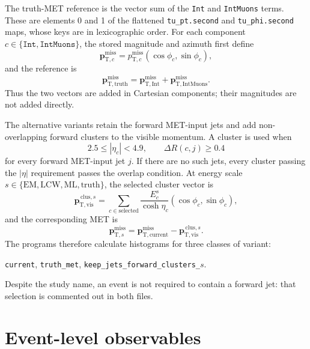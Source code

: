\documentclass[11pt,a4paper]{article}
\newcommand{\vmet}[1]{\boldsymbol{p}_{\mathrm{T},#1}^{\mathrm{miss}}}
\begin{document}
The truth-MET reference is the vector sum of the \texttt{Int} and
\texttt{IntMuons} terms.  These are elements 0 and 1 of the flattened
\texttt{tu\_pt.second} and \texttt{tu\_phi.second} maps, whose keys are in
lexicographic order.  For each component
$c\in\{\texttt{Int},\texttt{IntMuons}\}$, the stored magnitude and azimuth
first define
\begin{equation}
  \vmet{c}=p_{\mathrm{T},c}^{\mathrm{miss}}
    (\cos\phi_c,\sin\phi_c),
\end{equation}
and the reference is
\begin{equation}
  \vmet{\mathrm{truth}}
  =\vmet{\mathrm{Int}}+\vmet{\mathrm{IntMuons}}.
  \label{eq:truth-reference}
\end{equation}
Thus the two vectors are added in Cartesian components; their magnitudes are
not added directly.

The alternative variants retain the forward MET-input jets and add
non-overlapping forward clusters to the visible momentum.  A cluster is used
when
\begin{equation}
  2.5\leq |\eta_c|<4.9,
  \qquad
  \Delta R(c,j)\geq 0.4
\end{equation}
for every forward MET-input jet $j$.  If there are no such jets, every cluster
passing the $|\eta|$ requirement passes the overlap condition.  At energy
scale $s\in\{\mathrm{EM},\mathrm{LCW},\mathrm{ML},\mathrm{truth}\}$, the
selected cluster vector is
\begin{equation}
  \boldsymbol{p}_{\mathrm{T},\mathrm{vis}}^{\,\mathrm{clus},s}
  =\sum_{c\in\mathrm{selected}}
   \frac{E_c^s}{\cosh\eta_c}(\cos\phi_c,\sin\phi_c),
\end{equation}
and the corresponding MET is
\begin{equation}
  \vmet{s}
  =\vmet{\mathrm{current}}
   -\boldsymbol{p}_{\mathrm{T},\mathrm{vis}}^{\,\mathrm{clus},s}.
  \label{eq:cluster-met}
\end{equation}
The programs therefore calculate histograms for three classes of variant:
\begin{center}
  \texttt{current}, \qquad
  \texttt{truth\_met}, \qquad
  \texttt{keep\_jets\_forward\_clusters\_}\(s\).
\end{center}
Despite the study name, an event is not required to contain a forward jet:
that selection is commented out in both files.

\section{Event-level observables}
\end{document}

